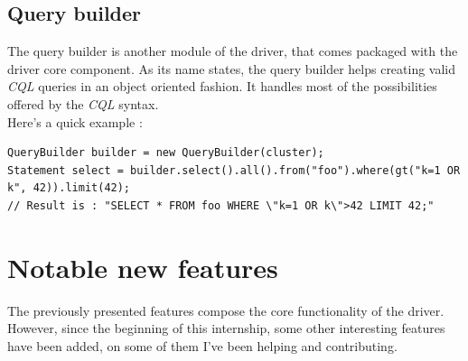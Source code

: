 \documentclass[a4paper]{report}
\begin{document}
\subsection{Query builder}
The query builder is another module of the driver, that comes packaged with the driver core component. As its name states, the query builder helps creating valid \emph{CQL} queries in an object oriented fashion. It handles most of the possibilities offered by the \emph{CQL} syntax.\\
Here's a quick example : 
\begin{lstlisting}[label=qb-ex-1, caption=Query Builder example, style=Java]
QueryBuilder builder = new QueryBuilder(cluster);
Statement select = builder.select().all().from("foo").where(gt("k=1 OR k", 42)).limit(42);
// Result is : "SELECT * FROM foo WHERE \"k=1 OR k\">42 LIMIT 42;"
\end{lstlisting}
\newpage


\section{Notable new features}
The previously presented features compose the core functionality of the driver. However, since the beginning of this internship, some other interesting features have been added, on some of them I've been helping and contributing.
\end{document}
